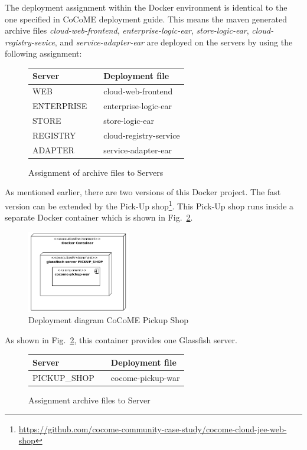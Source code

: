  	\noindent
 	The deployment assignment within the Docker environment is identical to the one specified in CoCoME deployment guide.
 	This means the maven generated archive files \textit{cloud-web-frontend}, \textit{enterprise-logic-ear}, \textit{store-logic-ear}, \textit{cloud-registry-sevice}, and \textit{service-adapter-ear} are deployed on the servers by using the following assignment:
 	\begin{figure}[H]
 		\centering
 		\begin{tabular}{l| l l}%
 			Server && Deployment file \\
 			\hline
 			WEB && cloud-web-frontend  \\
 			ENTERPRISE && enterprise-logic-ear  \\
 			STORE && store-logic-ear  \\
 			REGISTRY && cloud-registry-service  \\
 			ADAPTER && service-adapter-ear \\	
 		\end{tabular}
 		\caption{Assignment of archive files to Servers}
 		\label{table_assignment}
 	\end{figure}
 \noindent
    As mentioned earlier, there are two versions of this Docker project.
 	 The fast version can be extended by the Pick-Up shop\footnote{\url{https://github.com/cocome-community-case-study/cocome-cloud-jee-web-shop}}. This Pick-Up shop runs inside a separate Docker container which is shown in Fig.~\ref{Deploym_Pickup}.  
 	\begin{figure}[h]
 		\centering
 		\includegraphics[width = 0.4\textwidth]{img/docker_Container_PickUP.png}
 		\caption{Deployment diagram CoCoME Pickup Shop}
 		\label{Deploym_Pickup}
 	\end{figure}
 	As shown in Fig.~\ref{Deploym_Pickup}, this container provides one Glassfish server.
 	\begin{figure}[H]
 		\centering
 		\begin{tabular}{l|l l}%
 			Server && Deployment file \\
 			\hline
 			PICKUP\_SHOP && cocome-pickup-war \\	
 		\end{tabular}
 		\caption{Assignment archive files to Server}
 		\label{table_assignment_pickup}
 	\end{figure}
